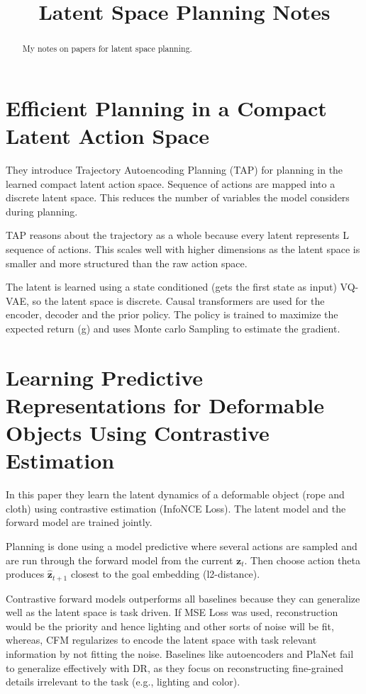\documentclass[12pt]{article}
\begin{document}
\title{Latent Space Planning Notes}
\author{}
\date{}

\maketitle

\begin{abstract}
My notes on papers for latent space planning.
\end{abstract}

\section{Efficient Planning in a Compact Latent Action Space}
They introduce Trajectory Autoencoding Planning (TAP) for planning in the learned compact latent action space. Sequence of actions are mapped into a discrete latent space. This reduces the number of variables the model considers during planning. 

TAP reasons about the trajectory as a whole because every latent represents L sequence of actions. This scales well with higher dimensions as the latent space is smaller and more structured than the raw action space.

The latent is learned using a state conditioned (gets the first state as input) VQ-VAE, so the latent space is discrete. Causal transformers are used for the encoder, decoder and the prior policy. The policy is trained to maximize the expected return (g) and uses Monte carlo Sampling to estimate the gradient.

\newpage
\section{Learning Predictive Representations for Deformable Objects Using Contrastive Estimation}
In this paper they learn the latent dynamics of a deformable object (rope and cloth) using contrastive estimation (InfoNCE Loss). The latent model and the forward model are trained jointly.

Planning is done using a model predictive where several actions are sampled and are run through the forward model from the current \(\mathbf{z}_{t}\). Then choose action theta produces \(\hat{\mathbf{z}}_{t+1}\) closest to the goal embedding (l2-distance).

Contrastive forward models outperforms all baselines because they can generalize well as the latent space is task driven. If MSE Loss was used, reconstruction would be the priority and hence lighting and other sorts of noise will be fit, whereas, CFM regularizes to encode the latent space with task relevant information by not fitting the noise. Baselines like autoencoders and PlaNet fail to generalize effectively with DR, as they focus on reconstructing fine-grained details irrelevant to the task (e.g., lighting and color).
\end{document}
